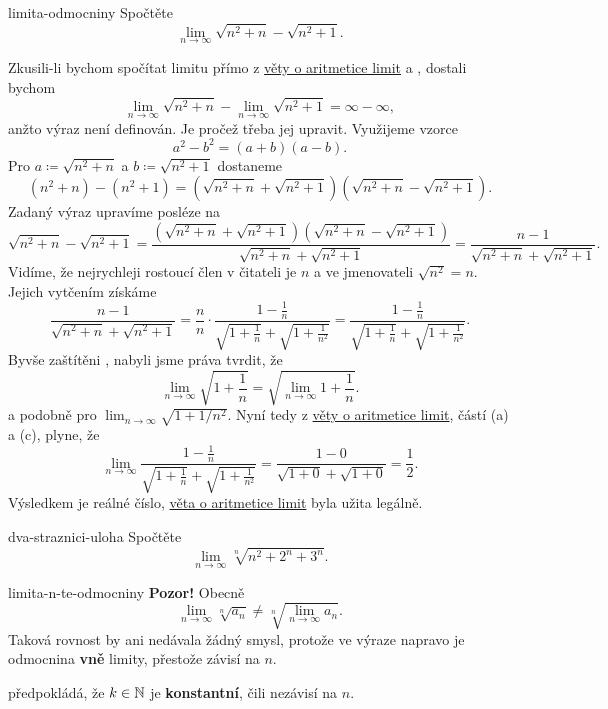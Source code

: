 \begin{problem}{}{limita-odmocniny}
 Spočtěte
 \[
  \lim_{n \to \infty} \sqrt{n^2 + n} - \sqrt{n^2 + 1}.
 \]
\end{problem}
\begin{probsol}
 Zkusili-li bychom spočítat limitu přímo z \hyperref[thm:aritmetika-limit]{věty
 o aritmetice limit} a , dostali bychom
 \[
  \lim_{n \to \infty} \sqrt{n^2 + n} - \lim_{n \to \infty} \sqrt{n^2 + 1} =
  \infty - \infty,
 \]
 anžto výraz není definován. Je pročež třeba jej upravit. Využijeme vzorce
 \[
  a^2 - b^2 = (a+b)(a-b).
 \]
 Pro $a \coloneqq \sqrt{n^2+n}$ a $b \coloneqq \sqrt{n^2+1}$ dostaneme
 \[
  (n^2 + n) - (n^2 + 1) = (\sqrt{n^2 + n} + \sqrt{n^2 + 1})(\sqrt{n^2 + n} -
  \sqrt{n^2 + 1}).
 \]
 Zadaný výraz upravíme posléze na
 \[
  \sqrt{n^2+n} - \sqrt{n^2+1} = \frac{(\sqrt{n^2+n} + \sqrt{n^2+1})(\sqrt{n^2+n}
  - \sqrt{n^2+1})}{\sqrt{n^2+n} + \sqrt{n^2+1}} = \frac{n - 1}{\sqrt{n^2 + n} +
 \sqrt{n^2 + 1}}.
 \]
 Vidíme, že nejrychleji rostoucí člen v čitateli je $n$ a ve jmenovateli
 $\sqrt{n^2} = n$. Jejich vytčením získáme
 \[
  \frac{n-1}{\sqrt{n^2 + n}+\sqrt{n^2+1}} = \frac{n}{n} \cdot \frac{1 -
  \frac{1}{n}}{\sqrt{1 + \frac{1}{n}} + \sqrt{1 + \frac{1}{n^2}}} = \frac{1 -
  \frac{1}{n}}{\sqrt{1 + \frac{1}{n}} + \sqrt{1 + \frac{1}{n^2}}}.
 \]
 Byvše zaštítěni , nabyli jsme práva
 tvrdit, že
 \[
  \lim_{n \to \infty} \sqrt{1 + \frac{1}{n}} = \sqrt{\lim_{n \to \infty} 1 +
  \frac{1}{n}}.
 \]
 a podobně pro $\lim_{n \to \infty} \sqrt{1 + 1 / n^2}$. Nyní tedy z
 \hyperref[thm:aritmetika-limit]{věty o aritmetice limit}, částí (a) a (c),
 plyne, že
 \[
  \lim_{n \to \infty}
  \frac{1-\frac{1}{n}}{\sqrt{1+\frac{1}{n}}+\sqrt{1+\frac{1}{n^2}}} =
  \frac{1-0}{\sqrt{1+0} + \sqrt{1+0}} = \frac{1}{2}.
 \]
 Výsledkem je reálné číslo, \hyperref[thm:aritmetika-limit]{věta o aritmetice
 limit} byla užita legálně.
\end{probsol}

\begin{problem}{}{dva-straznici-uloha}
 Spočtěte
 \[
  \lim_{n \to \infty} \sqrt[n]{n^2 + 2^{n} + 3^{n}}.
 \]
\end{problem}
\begin{warning}{}{limita-n-te-odmocniny}
 \textbf{Pozor!} Obecně
 \[
  \lim_{n \to \infty} \sqrt[n]{a_n} \neq \sqrt[n]{\lim_{n \to \infty} a_n}.
 \]
 Taková rovnost by ani nedávala žádný smysl, protože ve výraze napravo je
 odmocnina \textbf{vně} limity, přestože závisí na $n$.

  předpokládá, že $k \in \mathbb{N}$ je
 \textbf{konstantní}, čili nezávisí na $n$. 
\end{warning}

